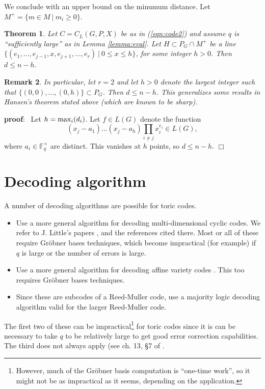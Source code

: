 \documentclass[12pt]{article}
\newtheorem{theorem}{Theorem}[section]
\newtheorem{remark}[theorem]{Remark}
\def\pf{{\bf proof}:\ }
\def\qed{$\Box$}
\def\fff{\mathbb{F}}
\begin{document}
We conclude with an upper bound on the minumum distance.
Let $M^+=\{m\in M\ |\ m_i\geq 0\}$.

\begin{theorem}
Let $C=C_L(G,P,X)$ be as in (\ref{eqn:code2})
and assume $q$ is ``sufficiently large'' as in Lemma
\ref{lemma:eval}. Let $H\subset P_G\cap M^+$
be a line 
\newline
$\{(e_1,...,e_{j-1},x,e_{j+1},...,e_r)\ |\ 0\leq x\leq h\}$,
for some integer $h>0$.
Then $d\leq n-h$.

\end{theorem}

\begin{remark}
In particular, let $r=2$ and let $h>0$ denote the 
largest integer such that $\{(0,0),...,(0,h)\}\subset P_G$.
Then $d\leq n-h$.
This generalizes some results in Hansen's theorem stated above
(which are known to be sharp).

\end{remark}

\pf
Let $h={\rm max}_i(d_i)$. Let $f\in L(G)$ denote the function
\[
(x_j-a_1)...(x_j-a_h)\prod_{i\not= j}x_i^{e_i}\in L(G),
\]
where $a_i\in \fff_q^\times$ are distinct.
This vanishes at $h$ points, so $d\leq n-h$.
\qed


\section{Decoding algorithm}
\label{sec:decode}

A number of decoding algorithms are possible for toric codes.

\begin{itemize}
\item
Use a more general algorithm for
decoding multi-dimensional cyclic
codes. We refer to J. Little's papers \cite{L1}, \cite{L2} 
and the references cited there. Most or all of these
require Gr\"obner bases techniques, which become impractical
(for example) if $q$ is large or the number of errors is large.

\item
Use a more general algorithm for
decoding affine variety codes \cite{FL}. This too
requires Gr\"obner bases techniques.

\item
Since these are subcodes of a Reed-Muller code,
use a majority logic decoding algorithm valid
for the larger Reed-Muller code. 
\end{itemize}
The first two of these can be impractical\footnote{However, much of the
Gr\"obner basis computation is ``one-time work'', so it might not be 
as impractical as it seems, depending on the application.}
for toric codes since 
it is can be necessary to take $q$ to be relatively large to get
good error correction capabilities. The third does not always
apply (see ch. 13, \S 7 of \cite{MS}. 
\end{document}
